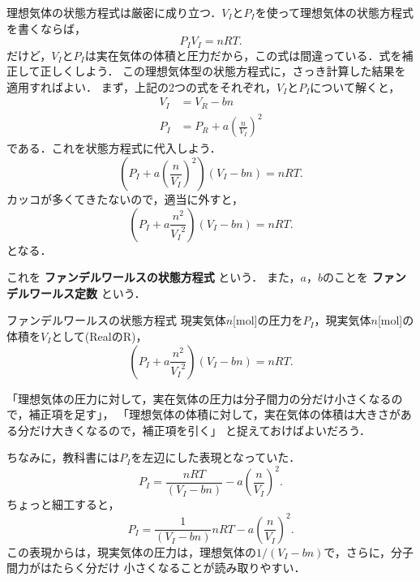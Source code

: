         理想気体の状態方程式は厳密に成り立つ．${V}_{I}$と${P}_{I}$を使って理想気体の状態方程式を書くならば，
        \[
            {P}_{I}{V}_{I} = nRT.
        \]
        だけど，${V}_{I}$と${P}_{I}$は実在気体の体積と圧力だから，この式は間違っている．式を補正して正しくしよう．
        この理想気体型の状態方程式に，さっき計算した結果を適用すればよい．
        まず，上記の2つの式をそれぞれ，${V}_{I}$と${P}_{I}$について解くと，
        \begin{align}
            {V}_{I} &= {V}_{R} - bn \\
            {P}_{I} &= {P}_{R} + a{\left( \frac{n}{{V}_{I}} \right)}^{2}
        \end{align}
        である．これを状態方程式に代入しよう．
        \begin{equation}
            \left( {P}_{I} + a{\left( \frac{n}{{V}_{I}} \right)}^{2} \right) \left( {V}_{I} - bn \right) = nRT.
        \end{equation}
        カッコが多くてきたないので，適当に外すと，
        \begin{equation}
            \left( {P}_{I} + a\frac{{n}^{2}}{{{V}_{I}}^{2}} \right) \left( {V}_{I} - bn \right) = nRT.
        \end{equation}
        となる．

        これを \textbf{ファンデルワールスの状態方程式} という．
        また，$a$，$b$のことを \textbf{ファンデルワールス定数} という．
        \begin{myshadebox}{ファンデルワールスの状態方程式}
            現実気体$n$[mol]の圧力を${P}_{I}$，現実気体$n$[mol]の体積を${V}_{I}$として(RealのR)，
            \begin{equation}
                \left( {P}_{I} + a\frac{{n}^{2}}{{{V}_{I}}^{2}} \right) \left( {V}_{I} - bn \right) = nRT.
            \end{equation}
        \end{myshadebox}

        「理想気体の圧力に対して，実在気体の圧力は分子間力の分だけ小さくなるので，補正項を足す」，
        「理想気体の体積に対して，実在気体の体積は大きさがある分だけ大きくなるので，補正項を引く」
        と捉えておけばよいだろう．

        ちなみに，教科書には${P}_{I}$を左辺にした表現となっていた．
        \begin{equation}
             {P}_{I}  =  \frac{nRT}{\left( {V}_{I} - bn \right)} - a{\left(\frac{n}{{V}_{I}} \right)}^{2}.
        \end{equation}
        ちょっと細工すると，
        \begin{equation*}
            {P}_{I}  =  \frac{1}{\left( {V}_{I} - bn \right)}nRT - a{\left(\frac{n}{{V}_{I}} \right)}^{2}.
       \end{equation*}
        この表現からは，現実気体の圧力は，理想気体の$1/({V}_{I} - bn)$で，さらに，分子間力がはたらく分だけ
        小さくなることが読み取りやすい．


